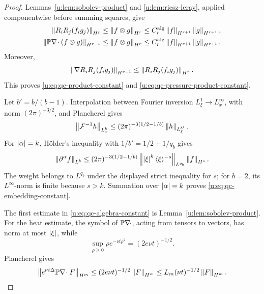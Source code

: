 \begin{proof}
Lemmas~\ref{u:lem:sobolev-product} and \ref{u:lem:riesz-leray}, applied
componentwise before summing squares, give
\begin{align*}
 \left\lVert R_iR_j(f_i g_j)\right\rVert_{H^r}
 &\le\left\lVert f\otimes g\right\rVert_{H^r}
 \le C_r^{\rm alg}\left\lVert f\right\rVert_{H^{r+1}}\left\lVert g\right\rVert_{H^{r+1}},\\
 \left\lVert \mathbb P\nabla\!\cdot(f\otimes g)\right\rVert_{H^{r-1}}
 &\le\left\lVert f\otimes g\right\rVert_{H^r}
 \le C_r^{\rm alg}\left\lVert f\right\rVert_{H^{r+1}}\left\lVert g\right\rVert_{H^{r+1}}.
\end{align*}
Moreover,
\[
 \left\lVert \nabla R_iR_j(f_i g_j)\right\rVert_{H^{r-1}}
 \le\left\lVert R_iR_j(f_i g_j)\right\rVert_{H^r}.
\]
This proves \eqref{u:eq:qc-product-constant} and
\eqref{u:eq:qc-pressure-product-constant}.

Let \(b'=b/(b-1)\).  Interpolation between Fourier inversion
\(L^1_\xi\to L^\infty_x\), with norm \((2\pi)^{-3/2}\), and Plancherel
gives
\[
 \left\lVert \mathcal F^{-1}h\right\rVert_{L^b_x}
 \le(2\pi)^{-3(1/2-1/b)}\left\lVert h\right\rVert_{L^{b'}_\xi}.
\]
For \(\left|\alpha\right|=k\), H\"older's inequality with
\(1/b'=1/2+1/q_b\) gives
\[
 \left\lVert \partial^\alpha f\right\rVert_{L^b}
 \le(2\pi)^{-3(1/2-1/b)}
 \left\lVert \left|\xi\right|^k\langle\xi\rangle^{-s}\right\rVert_{L^{q_b}}
 \left\lVert f\right\rVert_{H^s}.
\]
The weight belongs to \(L^{q_b}\) under the displayed strict inequality
for \(s\); for \(b=2\), its \(L^\infty\)-norm is finite because \(s>k\).
Summation over \(\left|\alpha\right|=k\) proves
\eqref{u:eq:qc-embedding-constant}.

The first estimate in \eqref{u:eq:qc-algebra-constant} is
Lemma~\ref{u:lem:sobolev-product}.  For the heat estimate, the symbol of
\(\mathbb P\nabla\!\cdot\), acting from tensors to vectors, has norm at most
\(\left|\xi\right|\), while
\[
 \sup_{\rho\ge0}\rho e^{-\nu t\rho^2}=(2e\nu t)^{-1/2}.
\]
Plancherel gives
\[
 \left\lVert e^{\nu t\Delta}\mathbb P\nabla\!\cdot F\right\rVert_{H^m}
 \le(2e\nu t)^{-1/2}\left\lVert F\right\rVert_{H^m}
 \le L_m(\nu t)^{-1/2}\left\lVert F\right\rVert_{H^m}.
\]
\end{proof}

